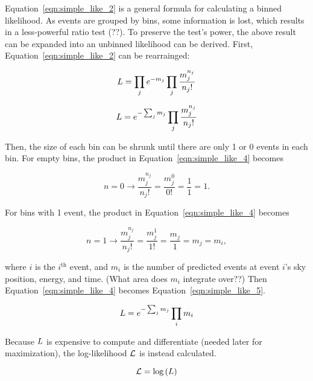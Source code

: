   Equation~\ref{eqn:simple_like_2} is a general formula for calculating a binned likelihood.
  As events are grouped by bins, some information is lost, which results in a less-powerful ratio test {\color{red}(??)}.
  To preserve the test's power, the above result can be expanded into an unbinned likelihood can be derived.
  First, Equation~\ref{eqn:simple_like_2} can be rearrainged:
  
  \begin{equation}\label{eqn:simple_like_3}
    L = \prod_j e^{-m_j} \prod_j \frac{m_j^{n_j}}{n_{j}!}
  \end{equation}
    
  \begin{equation}\label{eqn:simple_like_4}
    L = e^{- \sum_j m_j} \prod_j \frac{m_j^{n_j}}{n_{j}!}
  \end{equation}
  
  Then, the size of each bin can be shrunk until there are only 1 or 0 events in each bin.
  For empty bins, the product in Equation~\ref{eqn:simple_like_4} becomes
  
  \begin{equation}\label{eqn:simple_like_4a}
    n=0 \rightarrow \frac{m_j^{n_j}}{n_j!} = \frac{m_j^{0}}{0!} = \frac{1}{1} = 1 .
  \end{equation}

  For bins with 1 event, the product in Equation~\ref{eqn:simple_like_4} becomes

  \begin{equation}\label{eqn:simple_like_4b}
    n=1 \rightarrow \frac{m_j^{n_j}}{n_j!} = \frac{m_j^1}{1!} = \frac{m_j}{1} = m_j = m_i ,
  \end{equation}

  where $i$ is the $i^{\textrm{th}}$ event, and $m_i$ is the number of predicted events at event $i$'s sky position, energy, and time.
  {\color{red}(What area does $m_i$ integrate over??)}
  Then Equation~\ref{eqn:simple_like_4} becomes Equation~\ref{eqn:simple_like_5}.
  
  \begin{equation}\label{eqn:simple_like_5}
    L = e^{- \sum_j m_j} \prod_i m_i
  \end{equation}
  
  Because $L$ is expensive to compute and differentiate (needed later for maximization), the log-likelihood $\mathcal{L}$ is instead calculated.
  
  \begin{equation}\label{eqn:simple_like_6}
    \mathcal{L} = \textrm{log} \left ( L \right ) 
  \end{equation}
  
